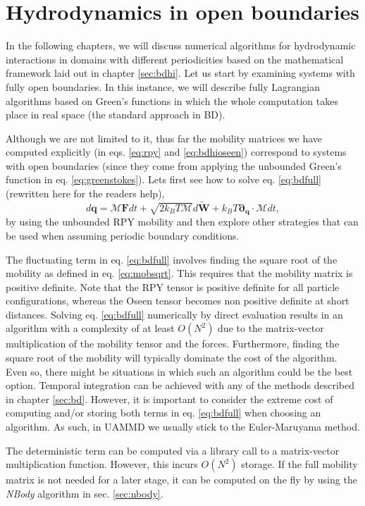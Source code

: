 \documentclass[ twoside,openright,titlepage,numbers=noenddot,%
headinclude,footinclude,cleardoublepage=empty,abstract=on,
BCOR=5mm,paper=a4,fontsize=11pt, dvipsnames
]{scrreprt}
\renewcommand{\vec}[1]{\bm{#1}}
\newcommand{\tens}[1]{\bm{\mathcal{#1}}}
\newcommand{\uammd}{\gls{UAMMD}\xspace}
\newcommand{\kT}{k_B T}
\newcommand{\noise}{\widetilde{W}}
\newcommand{\ppos}{q}
\begin{document}
\chapter{Hydrodynamics in open boundaries}
In the following chapters, we will discuss numerical algorithms for hydrodynamic interactions in domains with different periodicities based on the mathematical framework laid out in chapter \ref{sec:bdhi}. Let us start by examining systems with fully open boundaries. In this instance, we will describe fully Lagrangian algorithms based on Green's functions in which the whole computation takes place in real space (the standard approach in \gls{BD}).

Although we are not limited to it, thus far the mobility matrices we have computed explicitly (in eqs. \eqref{eq:rpy} and \eqref{eq:bdhioseen}) correspond to systems with open boundaries (since they come from applying the unbounded Green's function in eq. \eqref{eq:greenstokes}). Lets first see how to solve eq. \eqref{eq:bdfull} (rewritten here for the readers help),
$$  d\vec{\ppos} =\tens{M}\vec{F}dt + \sqrt{2\kT\tens{M}}d\vec{\noise} + \kT\vec{\partial}_{\vec{\ppos}}\cdot\tens{M}dt,$$
by using the unbounded \gls{RPY} mobility and then explore other strategies that can be used when assuming periodic boundary conditions.

The fluctuating term in eq. \eqref{eq:bdfull} involves finding the square root of the mobility as defined in eq. \eqref{eq:mobsqrt}.
This requires that the mobility matrix is positive definite. Note that the \gls{RPY} tensor is positive definite for all particle configurations, whereas the Oseen tensor becomes non positive definite at short distances.
Solving eq. \eqref{eq:bdfull} numerically by direct evaluation results in an algorithm with a complexity of at least $O(N^2)$ due to the matrix-vector multiplication of the mobility tensor and the forces. Furthermore, finding the square root of the mobility will typically dominate the cost of the algorithm. Even so, there might be situations in which such an algorithm could be the best option.
Temporal integration can be achieved with any of the methods described in chapter \ref{sec:bd}. However, it is important to consider the extreme cost of computing and/or storing both terms in eq. \eqref{eq:bdfull} when choosing an algorithm. As such, in \uammd we usually stick to the Euler-Maruyama method.

The deterministic term can be computed via a library call to a matrix-vector multiplication function. However, this incurs $O(N^2)$ storage. If the full mobility matrix is not needed for a later stage, it can be computed on the fly by using the \emph{NBody} algorithm in sec. \ref{sec:nbody}.
\end{document}
